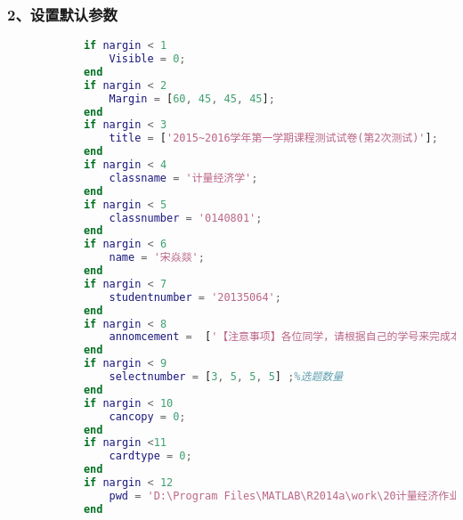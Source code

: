         \subsubsection{2、设置默认参数}
            \begin{lstlisting}[language=Matlab]
            %%%%%%%%%%%%%%%%%设置默认参数%%%%%%%%%%%%%%%%%
            if nargin < 1
                Visible = 0;
            end
            if nargin < 2
                Margin = [60, 45, 45, 45];
            end
            if nargin < 3
                title = ['2015~2016学年第一学期课程测试试卷(第2次测试)'];
            end
            if nargin < 4
                classname = '计量经济学';
            end
            if nargin < 5
                classnumber = '0140801';
            end
            if nargin < 6
                name = '宋焱燚';
            end
            if nargin < 7
                studentnumber = '20135064';
            end
            if nargin < 8
                annomcement =  ['【注意事项】各位同学，请根据自己的学号来完成本次测试题(见以学号命名的压缩包中，包括试卷、数据和答案表)，将答案(数值题保留四位小数、非数值题见各大题要求)填写在EXCEL工作薄中相应的单元格中，并在规定的时间内提交以自己学号命名的EXCEL工作薄。在计算相关的统计量及其P值时均不采用连续性修正！'];
            end
            if nargin < 9
                selectnumber = [3, 5, 5, 5] ;%选题数量
            end
            if nargin < 10
                cancopy = 0;
            end
            if nargin <11
                cardtype = 0;
            end
            if nargin < 12
                pwd = 'D:\Program Files\MATLAB\R2014a\work\20计量经济作业解\生成的试卷';
            end
            \end{lstlisting}
